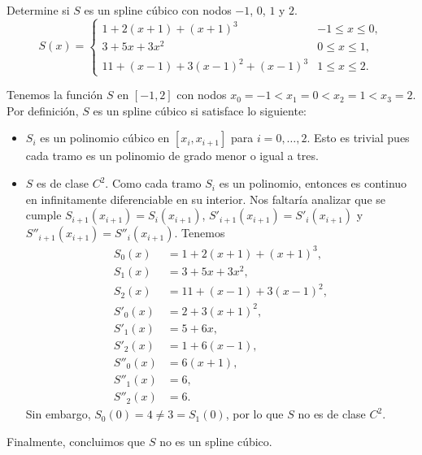 \begin{statement}{1}
  Determine si $S$ es un spline c\'ubico con nodos $-1$, $0$, $1$ y $2$.
  \[
    S(x) = 
    \begin{cases}
      1 + 2(x + 1) + (x + 1)^3 & -1 \leq x \leq 0, \\
      3 + 5x + 3x^2 & 0 \leq x \leq 1, \\
      11 + (x - 1) + 3 (x - 1)^2 + (x - 1)^3 & 1 \leq x \leq 2.
    \end{cases}
  \]
\end{statement}

\begin{solution}
  Tenemos la funci\'on $S$ en $[-1, 2]$ con nodos
  $x_0 = -1 < x_1 = 0 < x_2 = 1 < x_3 = 2$.
  Por definici\'on, $S$ es un spline c\'ubico si satisface lo siguiente:
  \begin{itemize}
    \item $S_i$ es un polinomio c\'ubico en $[x_i, x_{i + 1}]$ para $i = 0, \dots, 2$.
    Esto es trivial pues cada tramo es un polinomio de grado menor o igual a tres.
    \item $S$ es de clase $C^2$. Como cada tramo $S_i$ es un polinomio, entonces
    es continuo en infinitamente diferenciable en su interior.
    Nos faltar\'ia analizar que se cumple
    $S_{i + 1}(x_{i + 1}) = S_i(x_{i + 1})$,
    $S'_{i + 1}(x_{i + 1}) = S'_i(x_{i + 1})$ y
    $S''_{i + 1}(x_{i + 1}) = S''_i(x_{i + 1})$.
    Tenemos
    \begin{align*}
      S_0(x) &= 1 + 2(x + 1) + (x + 1)^3,\\
      S_1(x) &= 3 + 5x + 3x^2,\\
      S_2(x) &= 11 + (x - 1) + 3(x - 1)^2,\\
      S'_0(x) &= 2 + 3(x + 1)^2,\\
      S'_1(x) &= 5 + 6x,\\
      S'_2(x) &= 1 + 6(x - 1),\\
      S''_0(x) &= 6(x + 1),\\
      S''_1(x) &= 6,\\
      S''_2(x) &= 6.
    \end{align*}
    Sin embargo, $S_0(0) = 4 \neq 3 = S_1(0)$, por lo que $S$ no es de clase $C^2$.
  \end{itemize}
  Finalmente, concluimos que $S$ no es un spline c\'ubico.
\end{solution}
